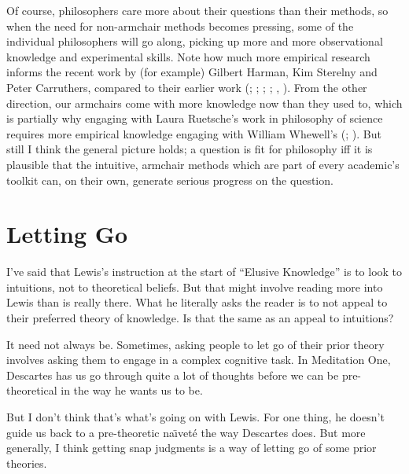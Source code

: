 \documentclass[
  11pt,
  letterpaper,
  DIV=11,
  numbers=noendperiod,
  twoside]{scrartcl}
\begin{document}
Of course, philosophers care more about their questions than their
methods, so when the need for non-armchair methods becomes pressing,
some of the individual philosophers will go along, picking up more and
more observational knowledge and experimental skills. Note how much more
empirical research informs the recent work by (for example) Gilbert
Harman, Kim Sterelny and Peter Carruthers, compared to their earlier
work (;
;
;
;
,
). From the other direction, our
armchairs come with more knowledge now than they used to, which is
partially why engaging with Laura Ruetsche's work in philosophy of
science requires more empirical knowledge engaging with William
Whewell's (;
). But still I think the general
picture holds; a question is fit for philosophy iff it is plausible that
the intuitive, armchair methods which are part of every academic's
toolkit can, on their own, generate serious progress on the question.

\section{Letting Go}\label{sec-Go}

I've said that Lewis's instruction at the start of ``Elusive Knowledge''
is to look to intuitions, not to theoretical beliefs. But that might
involve reading more into Lewis than is really there. What he literally
asks the reader is to not appeal to their preferred theory of knowledge.
Is that the same as an appeal to intuitions?

It need not always be. Sometimes, asking people to let go of their prior
theory involves asking them to engage in a complex cognitive task. In
Meditation One, Descartes has us go through quite a lot of thoughts
before we can be pre-theoretical in the way he wants us to be.

But I don't think that's what's going on with Lewis. For one thing, he
doesn't guide us back to a pre-theoretic naı̈veté the way Descartes does.
But more generally, I think getting snap judgments is a way of letting
go of some prior theories.
\end{document}
